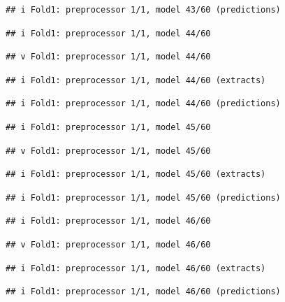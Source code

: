 \documentclass[
]{article}
\begin{document}
\begin{verbatim}
## i Fold1: preprocessor 1/1, model 43/60 (predictions)
\end{verbatim}

\begin{verbatim}
## i Fold1: preprocessor 1/1, model 44/60
\end{verbatim}

\begin{verbatim}
## v Fold1: preprocessor 1/1, model 44/60
\end{verbatim}

\begin{verbatim}
## i Fold1: preprocessor 1/1, model 44/60 (extracts)
\end{verbatim}

\begin{verbatim}
## i Fold1: preprocessor 1/1, model 44/60 (predictions)
\end{verbatim}

\begin{verbatim}
## i Fold1: preprocessor 1/1, model 45/60
\end{verbatim}

\begin{verbatim}
## v Fold1: preprocessor 1/1, model 45/60
\end{verbatim}

\begin{verbatim}
## i Fold1: preprocessor 1/1, model 45/60 (extracts)
\end{verbatim}

\begin{verbatim}
## i Fold1: preprocessor 1/1, model 45/60 (predictions)
\end{verbatim}

\begin{verbatim}
## i Fold1: preprocessor 1/1, model 46/60
\end{verbatim}

\begin{verbatim}
## v Fold1: preprocessor 1/1, model 46/60
\end{verbatim}

\begin{verbatim}
## i Fold1: preprocessor 1/1, model 46/60 (extracts)
\end{verbatim}

\begin{verbatim}
## i Fold1: preprocessor 1/1, model 46/60 (predictions)
\end{verbatim}
\end{document}
